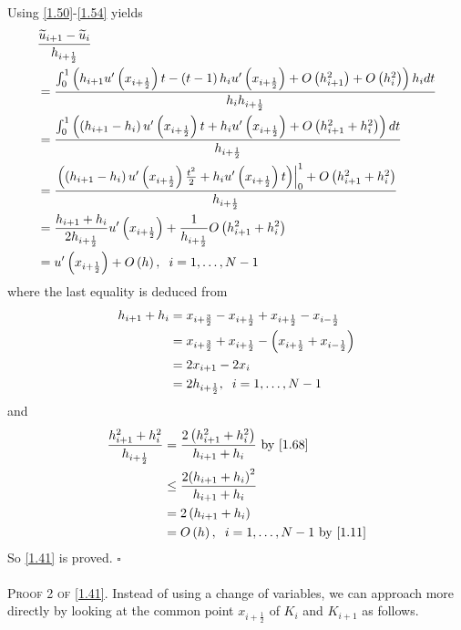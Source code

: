 \documentclass[a4paper]{article}
\numberwithin{equation}{section}
\begin{document}
Using \eqref{1.50}-\eqref{1.54} yields
\begin{align}
&\frac{{{{\widetilde u}_{i + 1}} - {{\widetilde u}_i}}}{{{h_{i + \frac{1}{2}}}}}\\
& = \frac{{\int_0^1 {\left( {{h_{i + 1}}u'\left( {{x_{i + \frac{1}{2}}}} \right)t - \left( {t - 1} \right){h_i}u'\left( {{x_{i + \frac{1}{2}}}} \right) + O\left( {h_{i + 1}^2} \right) + O\left( {h_i^2} \right)} \right){h_i}dt} }}{{{h_i}{h_{i + \frac{1}{2}}}}}\\
& = \frac{{\int_0^1 {\left( {\left( {{h_{i + 1}} - {h_i}} \right)u'\left( {{x_{i + \frac{1}{2}}}} \right)t + {h_i}u'\left( {{x_{i + \frac{1}{2}}}} \right) + O\left( {h_{i + 1}^2 + h_i^2} \right)} \right)dt} }}{{{h_{i + \frac{1}{2}}}}}\\
& = \frac{{\left. {\left( {\left( {{h_{i + 1}} - {h_i}} \right)u'\left( {{x_{i + \frac{1}{2}}}} \right)\frac{{{t^2}}}{2} + {h_i}u'\left( {{x_{i + \frac{1}{2}}}} \right)t} \right)} \right|_0^1 + O\left( {h_{i + 1}^2 + h_i^2} \right)}}{{{h_{i + \frac{1}{2}}}}}\\
& = \frac{{{h_{i + 1}} + {h_i}}}{{2{h_{i + \frac{1}{2}}}}}u'\left( {{x_{i + \frac{1}{2}}}} \right) + \frac{1}{{{h_{i + \frac{1}{2}}}}}O\left( {h_{i + 1}^2 + h_i^2} \right)\\
& = u'\left( {{x_{i + \frac{1}{2}}}} \right) + O\left( h \right),\hspace{0.2cm} i=1,\ldots,N-1
\end{align}
where the last equality is deduced from
\begin{align}
{h_{i + 1}} + {h_i} &= {x_{i + \frac{3}{2}}} - {x_{i + \frac{1}{2}}} + {x_{i + \frac{1}{2}}} - {x_{i - \frac{1}{2}}}\\
 &= {x_{i + \frac{3}{2}}} + {x_{i + \frac{1}{2}}} - \left( {{x_{i + \frac{1}{2}}} + {x_{i - \frac{1}{2}}}} \right)\\
 &= 2{x_{i + 1}} - 2{x_i}\\
 &= 2{h_{i + \frac{1}{2}}},\hspace{0.2cm} i = 1, \ldots ,N-1 \label{1.68}
\end{align}
and
\begin{align}
\frac{{h_{i + 1}^2 + h_i^2}}{{{h_{i + \frac{1}{2}}}}} &= \frac{{2\left( {h_{i + 1}^2 + h_i^2} \right)}}{{{h_{i + 1}} + {h_i}}}\mbox{ by \eqref{1.68}}\\
 &\le \frac{{2{{\left( {{h_{i + 1}} + {h_i}} \right)}^2}}}{{{h_{i + 1}} + {h_i}}}\\
 &= 2\left( {{h_{i + 1}} + {h_i}} \right)\\
 &= O\left( h \right),\hspace{0.2cm} i = 1, \ldots ,N-1\mbox{ by \eqref{1.11}}
\end{align}
So \eqref{1.41} is proved. \hfill $\square$\\
\\
\textsc{Proof 2 of \eqref{1.41}.} Instead of using a change of variables, we can approach more directly by looking at the common point $x_{i+\frac{1}{2}}$ of $K_i$ and $K_{i+1}$ as follows.
\end{document}

